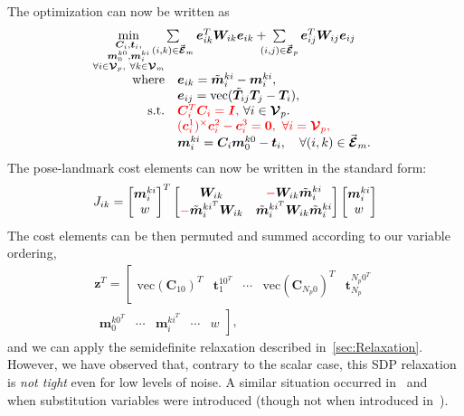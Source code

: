 \documentclass[lettersize,journal]{IEEEtran}
\newcommand{\EdgeSet}{\vec{\bm{\mathcal{E}}}}
\newcommand{\VertSetP}{\bm{\mathcal{V}}_p}
\newcommand{\VertSetM}{\bm{\mathcal{V}}_m}
\newcommand{\vect}[1]{\mbox{vec}(#1)}
\newcommand{\rev}[1]{\color{red}{#1}\color{black}}
\begin{document}
The optimization can now be written as
\begin{equation}
	\hspace*{-5pt}
	\label{opt:SLAM}
	\begin{array}{rl} 
		\min \limits_{ \substack{\bm{C}_i,\bm{t}_i, \\ \bm{m}_0^{k0},\bm{m}_i^{ki} \\ \forall i\in \VertSetP,~ \forall k\in\VertSetM } } & \hspace*{-20pt}\sum\limits_{(i,k)\in\EdgeSet_m} \bm{e}_{ik}^T \bm{W}_{ik} \bm{e}_{ik} + \hspace*{-7pt}\sum\limits_{(i,j)\in\EdgeSet_p}  \bm{e}_{ij}^T \bm{W}_{ij} \bm{e}_{ij}\hfill \\
		\mbox{where} & \bm{e}_{ik} = \tilde{\bm{m}}_i^{ki} - \bm{m}_i^{ki},\\
		&\bm{e}_{ij} = \vect{\tilde{\bm{T}}_{ij}\bm{T}_j - \bm{T}_i},\\
		\mbox{s.t.}&\rev{\bm{C}_i^T \bm{C}_i = \bm{I},}~\forall i \in \VertSetP.\\
		& \rev{(\bm{c}_i^{1})^\times\bm{c}_i^{2} - \bm{c}_i^{3} = \bm{0},~\forall i = \VertSetP,}\\
		& \bm{m}_i^{ki} = \bm{C}_i\bm{m}_0^{k0} - \bm{t}_i, \quad \forall (i,k)\in\EdgeSet_m.
	\end{array}
\end{equation}
The pose-landmark cost elements can now be written in the standard form:
\begin{equation*}
	J_{ik}=\begin{bmatrix}
		\bm{m}_i^{ki}\\w
	\end{bmatrix}^T \begin{bmatrix}
		\bm{W}_{ik} & \rev{-}\bm{W}_{ik}\tilde{\bm{m}}_i^{ki}\\
		\rev{-}\tilde{\bm{m}}_i^{ki^T}\bm{W}_{ik} & \tilde{\bm{m}}_i^{ki^T}\bm{W}_{ik}\tilde{\bm{m}}_i^{ki}
	\end{bmatrix}\begin{bmatrix}
	\bm{m}_i^{ki}\\w
	\end{bmatrix}
\end{equation*}
The cost elements can be then permuted and summed according to our variable ordering,
\begin{multline}
	\bm{z}^T = \left[\begin{matrix}\vect{\bm{C}_{10}}^T &\bm{t}_1^{10^T} & \cdots &\vect{\bm{C}_{N_p0}}^T&\bm{t}_{N_p}^{N_p0^T} \end{matrix}\right. \\
		\left.\begin{matrix} \bm{m}_0^{k0^T} &\cdots& \bm{m}_i^{ki^T} & \cdots & w \end{matrix}\right],
\end{multline}
and we can apply the semidefinite relaxation described in~\ref{sec:Relaxation}. However, we have observed that, contrary to the scalar case, this SDP relaxation is \emph{not tight} even for low levels of noise. A similar situation occurred in~\cite{brialesCertifiablyGloballyOptimal2018} and~\cite{yangTEASERFastCertifiable2021} when substitution variables were introduced (though not when introduced in~\cite{dumbgenSafeSmoothCertified2023}).
\end{document}
